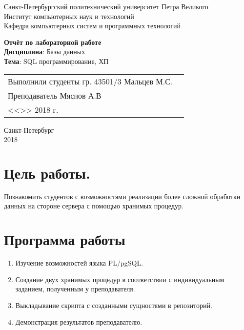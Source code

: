 \documentclass[a4paper,14pt]{extarticle}
\begin{document}
\begin{titlepage}
\centering
Санкт-Петербургский политехнический университет Петра Великого \\
Институт компьютерных наук и технологий \\
Кафедра компьютерных систем и программных технологий \\
\vspace{5.5cm}

{\centering \textbf{Отчёт по лабораторной работе} \\ 
\vspace{0.15cm}
\textbf{Дисциплина}: Базы данных \\
\vspace{0.15cm}
\textbf{Тема}: SQL программирование, ХП} \\

\vspace{5.5cm}

\begin{table}[H]
\begin{tabular}{p{\textwidth}@{}r}
{Выполнили студенты гр. 43501/3} \hfill 
\vspace{0.2cm}
Мальцев М.С. \\ \hfill
\vspace{0.2cm}

Преподаватель \hfill 
\vspace{0.2cm}
Мяснов А.В \\ \hfill 
\vspace{0.2cm}

{} \hfill { <<\underline{\hspace{0.08\textwidth}}>> \underline{\hspace{0.2\textwidth}}2018 г.} \\
\end{tabular}
\end{table}
\vfill
{\centering Санкт-Петербург \\ 
\vspace{0.15cm}
2018}
\end{titlepage}

\section{Цель работы.}
Познакомить студентов с возможностями реализации более сложной обработки данных на стороне сервера с помощью хранимых процедур.

\section{Программа работы}
\begin{enumerate}
\item Изучение возможностей языка PL/pgSQL.
\item Создание двух хранимых процедур в соответствии с индивидуальным заданием, полученным у преподавателя.
\item Выкладывание скрипта с созданными сущностями в репозиторий.
\item Демонстрация результатов преподавателю.
\end{enumerate}
\end{document}
